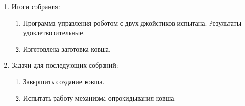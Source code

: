 \begin{enumerate}
\begin{enumerate}
	\end{enumerate}
	
	\item Итоги собрания:
	\begin{enumerate}
		\item Программа управления роботом с двух джойстиков испытана. Результаты удовлетворительные.
		
		\item Изготовлена заготовка ковша.
		
	\end{enumerate}
	
	\item Задачи для последующих собраний:
	\begin{enumerate}
		\item Завершить создание ковша.
		
		\item Испытать работу механизма опрокидывания ковша.
		
	\end{enumerate}     
\end{enumerate}

\fillpage

